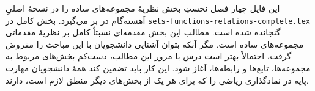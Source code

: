 \documentclass[../../include/open-logic-part]{subfiles}
\begin{document}

\begin{editorial}
  این فایل چهار فصل نخستِ بخش نظریهٔ مجموعه‌های ساده را در نسخهٔ اصلیِ
  آهسته‌گام در بر می‌گیرد. بخش کامل در
  \verb|sets-functions-relations-complete.tex| گنجانده شده است. مطالب این
  بخش مقدمه‌ای نسبتاً کامل بر نظریهٔ مقدماتی مجموعه‌های ساده است. مگر آنکه
  بتوان آشنایی دانشجویان با این مباحث را مفروض گرفت، احتمالاً بهتر است درس
  با مرور این مطالب، دست‌کم بخش‌های مربوط به مجموعه‌ها، تابع‌ها و رابطه‌ها،
  آغاز شود. این کار باید تضمین کند همهٔ دانشجویان مهارت پایه در نمادگذاری
  ریاضی را که برای هر یک از بخش‌های دیگر منطق لازم است، دارند.
\end{editorial}





\OLEndPartHook
\end{document}
